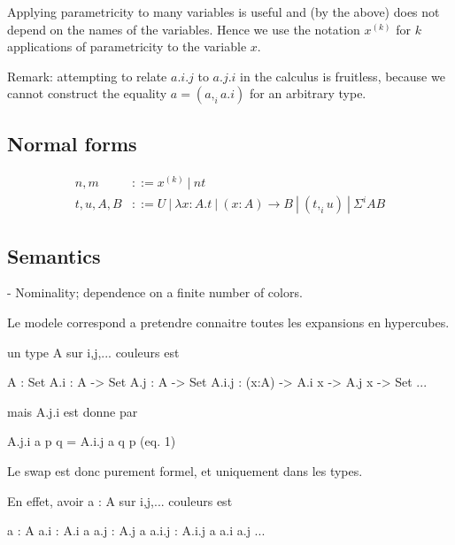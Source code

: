 \documentclass[10pt,a4paper]{article}
\newcommand\CC[4]{(#2,_{#1} #3)}
\newcommand\CP[3]{(#2,_{#1} #3)}
\newcommand\CSig[1]{\Sigma^{#1}}
\newcommand\pvar[2]{{#1}^{(#2)}}
\begin{document}
Applying parametricity to many variables is useful and (by the above)
does not depend on the names of the variables. Hence we use the
notation $\pvar x k$ for $k$ applications of parametricity to the
variable $x$.

Remark: attempting to relate $a.i.j$ to $a.j.i$ in the calculus is
fruitless, because we cannot construct the equality $a = \CP i a
{a.i}$ for an arbitrary type.

\subsection{Normal forms}

\begin{align*}
  n,m & ::= \pvar x k ~|~ n t \\
  t,u,A,B & ::= U ~|~ λx:A. t   ~|~  (x:A) → B
             ~|~ \CC i t u A ~|~ \CSig i A B
\end{align*}


\subsection{Semantics}

- Nominality; dependence on a finite number of colors.

Le modele correspond a pretendre connaitre toutes les expansions en hypercubes.

un type A sur i,j,... couleurs est

A : Set
A.i : A -> Set
A.j : A -> Set
A.i.j : (x:A) -> A.i x -> A.j x -> Set
...

mais A.j.i est donne par

A.j.i a p q = A.i.j a q p     (eq. 1)

Le swap est donc purement formel, et uniquement dans les types.

En effet, avoir a : A sur i,j,... couleurs est

a : A
a.i : A.i a
a.j : A.j a
a.i.j : A.i.j a a.i a.j
...
\end{document}
